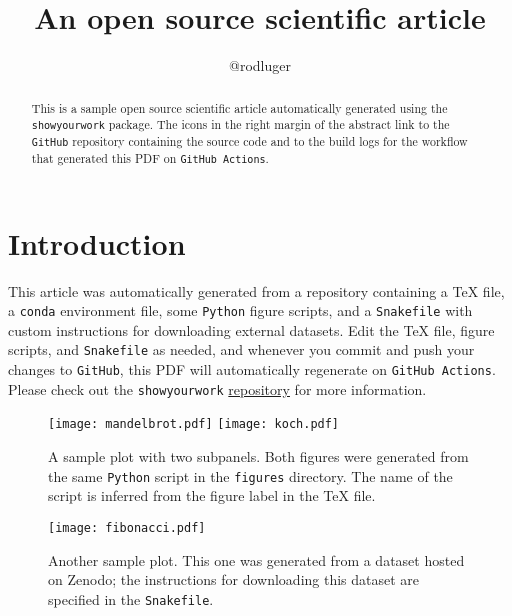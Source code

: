 \documentclass[twocolumn]{aastex631}
\begin{document}
\title{An open source scientific article}

\author{@rodluger}

\begin{abstract}
    This is a sample open source scientific article automatically generated using the \texttt{showyourwork} package.
    The icons in the right margin of the abstract link to the \texttt{GitHub} repository containing the source code and to the build logs for the workflow that generated this PDF on \texttt{GitHub Actions}.
\end{abstract}

\section{Introduction}
This article was automatically generated from a repository containing a TeX file,
a \texttt{conda} environment file, some \texttt{Python} figure scripts, and a \texttt{Snakefile} with custom instructions for downloading external datasets.
Edit the TeX file, figure scripts, and \texttt{Snakefile} as needed, and whenever you commit and push your changes to \texttt{GitHub}, this PDF will automatically regenerate on \texttt{GitHub Actions}. Please check out the \texttt{showyourwork} \href{https://github.com/rodluger/showyourwork}{repository} for more information.

\begin{figure}[ht!]
    \begin{centering}
        \texttt{[image: mandelbrot.pdf]}
        \texttt{[image: koch.pdf]}
        \caption{
            A sample plot with two subpanels.
            Both figures were generated from the same \texttt{Python} script in the \texttt{figures} directory.
            The name of the script is inferred from the figure label in the TeX file.
        }
        \label{fig:fractals}
    \end{centering}
\end{figure}

\begin{figure}[ht!]
    \begin{centering}
        \texttt{[image: fibonacci.pdf]}
        \caption{
            Another sample plot.
            This one was generated from a dataset hosted on Zenodo; the instructions for downloading this dataset are specified in the \texttt{Snakefile}.
        }
        \label{fig:fibonacci}
    \end{centering}
\end{figure}
\end{document}
